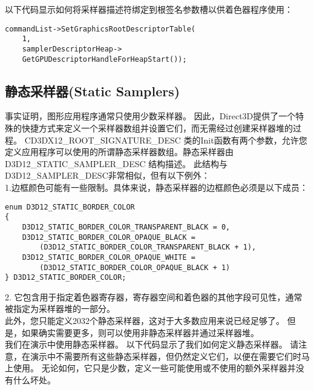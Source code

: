 \begin{flushleft}
以下代码显示如何将采样器描述符绑定到根签名参数槽以供着色器程序使用：\\
\end{flushleft}

\begin{lstlisting}
commandList->SetGraphicsRootDescriptorTable(
    1,
    samplerDescriptorHeap->
    GetGPUDescriptorHandleForHeapStart());
\end{lstlisting}

\subsection{静态采样器(Static Samplers)}
\begin{flushleft}
事实证明，图形应用程序通常只使用少数采样器。 因此，Direct3D提供了一个特殊的快捷方式来定义一个采样器数组并设置它们，而无需经过创建采样器堆的过程。 CD3DX12\_ROOT\_SIGNATURE\_DESC 类的Init函数有两个参数，允许您定义应用程序可以使用的所谓静态采样器数组。静态采样器由D3D12\_STATIC\_SAMPLER\_DESC 结构描述。 此结构与D3D12\_SAMPLER\_DESC非常相似，但有以下例外：\\

1.边框颜色可能有一些限制。具体来说，静态采样器的边框颜色必须是以下成员：\\
\end{flushleft}

\begin{lstlisting}
enum D3D12_STATIC_BORDER_COLOR
{
    D3D12_STATIC_BORDER_COLOR_TRANSPARENT_BLACK = 0,
    D3D12_STATIC_BORDER_COLOR_OPAQUE_BLACK = 
        (D3D12_STATIC_BORDER_COLOR_TRANSPARENT_BLACK + 1),
    D3D12_STATIC_BORDER_COLOR_OPAQUE_WHITE = 
        (D3D12_STATIC_BORDER_COLOR_OPAQUE_BLACK + 1)
} D3D12_STATIC_BORDER_COLOR;
\end{lstlisting}

\begin{flushleft}
2. 它包含用于指定着色器寄存器，寄存器空间和着色器的其他字段可见性，通常被指定为采样器堆的一部分。\\

此外，您只能定义2032个静态采样器，这对于大多数应用来说已经足够了。 但是，如果确实需要更多，则可以使用非静态采样器并通过采样器堆。\\
我们在演示中使用静态采样器。 以下代码显示了我们如何定义静态采样器。 请注意，在演示中不需要所有这些静态采样器，但仍然定义它们，以便在需要它们时马上使用。 无论如何，它只是少数，定义一些可能使用或不使用的额外采样器并没有什么坏处。\\
\end{flushleft}

